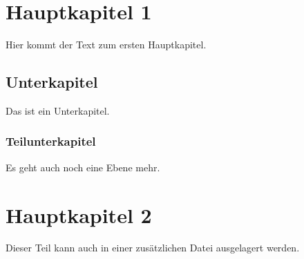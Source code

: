 \chapter{Hauptkapitel 1}
Hier kommt der Text zum ersten Hauptkapitel.
\section{Unterkapitel}
Das ist ein Unterkapitel.
\subsection{Teilunterkapitel}
Es geht auch noch eine Ebene mehr.
\chapter{Hauptkapitel 2}
Dieser Teil kann auch in einer zusätzlichen Datei ausgelagert werden.
